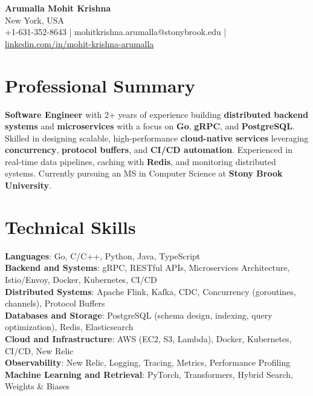 \documentclass[letterpaper,11pt]{article}
\begin{document}
\begin{center}
  {\Large \textbf{Arumalla Mohit Krishna}} \\
  New York, USA \\
  +1-631-352-8643 \enspace | \enspace mohitkrishna.arumalla@stonybrook.edu \enspace | \enspace \href{https://www.linkedin.com/in/mohit-krishna-arumalla}{linkedin.com/in/mohit-krishna-arumalla}
\end{center}

\section{Professional Summary}
  \begin{itemize}[leftmargin=0.15in, label={}]
    \small{\item{
     \textbf{Software Engineer} with 2+ years of experience building \textbf{distributed backend systems} and \textbf{microservices} with a focus on \textbf{Go}, \textbf{gRPC}, and \textbf{PostgreSQL}. Skilled in designing scalable, high-performance \textbf{cloud-native services} leveraging \textbf{concurrency}, \textbf{protocol buffers}, and \textbf{CI/CD automation}. Experienced in real-time data pipelines, caching with \textbf{Redis}, and monitoring distributed systems. Currently pursuing an MS in Computer Science at \textbf{Stony Brook University}.
    }}
  \end{itemize}
\vspace{-16pt}

\section{Technical Skills}
 \begin{itemize}[leftmargin=0.15in, label={}]
    \small{\item{
     \textbf{Languages}: Go, C/C++, Python, Java, TypeScript \\
     \textbf{Backend and Systems}: gRPC, RESTful APIs, Microservices Architecture, Istio/Envoy, Docker, Kubernetes, CI/CD \\
     \textbf{Distributed Systems}: Apache Flink, Kafka, CDC, Concurrency (goroutines, channels), Protocol Buffers \\
     \textbf{Databases and Storage}: PostgreSQL (schema design, indexing, query optimization), Redis, Elasticsearch \\
     \textbf{Cloud and Infrastructure}: AWS (EC2, S3, Lambda), Docker, Kubernetes, CI/CD, New Relic \\
     \textbf{Observability}: New Relic, Logging, Tracing, Metrics, Performance Profiling \\
     \textbf{Machine Learning and Retrieval}: PyTorch, Transformers, Hybrid Search, Weights \& Biases
    }}
 \end{itemize}
\vspace{-16pt}
\end{document}
